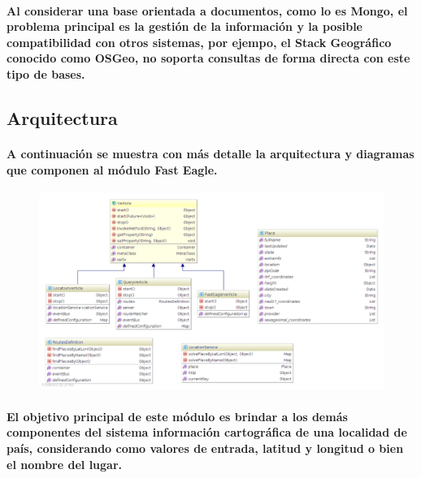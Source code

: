     \paragraph{Al considerar una base orientada a documentos, como lo es Mongo, el problema principal es la gestión de la información y la posible compatibilidad con otros sistemas, por ejempo, el Stack Geográfico conocido como OSGeo\cite{38}, no soporta consultas de forma directa con este tipo de bases.}
  \subsection{Arquitectura}
    \paragraph{A continuación se muestra con más detalle la arquitectura y diagramas que componen al módulo Fast Eagle. }
    \begin{figure}[h!]
        \centering
          \includegraphics[width=\textwidth]{./images/FastEagleClassDiagram.png}
    \end{figure}
    \paragraph{El objetivo principal de este módulo es brindar a los demás componentes del sistema información cartográfica de una localidad de país, considerando como valores de entrada, latitud y longitud o bien el nombre del lugar.}
